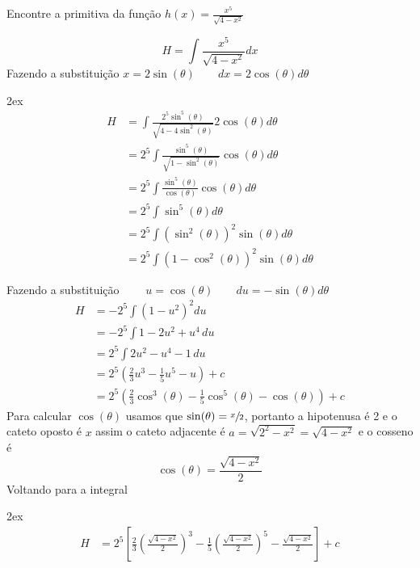 \documentclass[a4paper,12pt,fleqn]{article}
\begin{document}
Encontre a primitiva da função \( h(x) = \frac{x^5}{\sqrt{4-x^2}} \)

\begin{answer}
  \[
  H = \int \frac{x^5}{\sqrt{4-x^2}} dx
  \]
  Fazendo a substituição
  \(
  x = 2\sin(\theta)
  \qquad
  dx = 2\cos(\theta) d\theta
  \)
  \begin{spreadlines}{2ex}
    \begin{align*}
      H
      & = \int \frac{2^5 \sin^5(\theta)}{\sqrt{4-4\sin^2(\theta)}} 2\cos(\theta) d\theta \\
      & = 2^5 \int \frac{\sin^5(\theta)}{\sqrt{1-\sin^2(\theta)}} \cos(\theta) d\theta \\
      & = 2^5 \int \frac{\sin^5(\theta)}{\cos(\theta)} \cos(\theta) d\theta \\
      & = 2^5 \int \sin^5(\theta) d\theta \\
      & = 2^5 \int \left(\sin^2(\theta)\right)^2 \sin(\theta) d\theta \\
      & = 2^5 \int \left(1-\cos^2(\theta)\right)^2 \sin(\theta) d\theta
    \end{align*}
  \end{spreadlines}
  Fazendo a substituição
  \(
  \qquad
  u = \cos(\theta)
  \qquad
  du = -\sin(\theta)d\theta
  \)
  \begin{align*}
    H
    & = -2^5 \int \left(1-u^2\right)^2 du \\
    & = -2^5 \int 1-2u^2 + u^4\, du \\
    & = 2^5 \int 2u^2 - u^4 -1\, du \\
    & = 2^5 \left(\frac{2}{3}u^3 - \frac{1}{5}u^5 - u \right) + c \\
    & = 2^5 \left(\frac{2}{3}\cos^3(\theta)
    - \frac{1}{5}\cos^5(\theta)
    - \cos(\theta) \right) + c
  \end{align*}
  Para calcular \(\cos(\theta)\) usamos que \(\sin(\theta) = \sfrac{x}{2}\), portanto
  a hipotenusa é 2 e o cateto oposto é $x$ assim o cateto adjacente é
  \(
  a = \sqrt{2^2-x^2} = \sqrt{4-x^2}
  \)
  e o cosseno é
  \[
  \cos(\theta) = \frac{\sqrt{4-x^2}}{2}
  \]
  Voltando para a integral
  \begin{spreadlines}{2ex}
    \begin{align*}
      H
      & = 2^5\left[
      \frac{2}{3}\left(\frac{\sqrt{4-x^2}}{2}\right)^3
      - \frac{1}{5}\left(\frac{\sqrt{4-x^2}}{2}\right)^5
      - \frac{\sqrt{4-x^2}}{2}
      \right] + c \\

\end{align*}
\end{spreadlines}
\end{answer}
\end{document}
